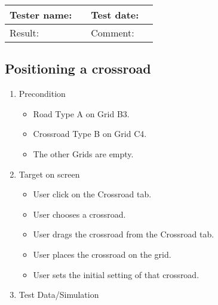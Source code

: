 \begin{tabularx}{\textwidth}{|p{3cm}X|p{3cm}X|}\hline
	Tester name: &  & Test date: & \\\hline
	Result: &   \pass & Comment: & \\\hline
\end{tabularx}

\newpage

\subsection{Positioning a crossroad}

\begin{enumerate}
	\item Precondition
	\begin{itemize}
		\item Road Type A on Grid B3.
		\item Crossroad Type B on Grid C4. 
		\item The other Grids are empty. 		
	\end{itemize}

	\item Target on screen
	\begin{itemize}
		\item User click on the Crossroad tab.
		\item User chooses a crossroad.
		\item User drags the crossroad from the Crossroad tab.
		\item User places the crossroad on the grid.
		\item User sets the initial setting of that crossroad.
	\end{itemize}
	\item Test Data/Simulation
\end{enumerate}	
